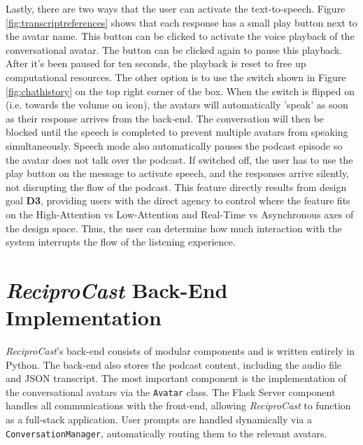 \documentclass[12pt]{report}
\begin{document}
\begin{myfont}
        \indent Lastly, there are two ways that the user can activate the text-to-speech. Figure \ref{fig:transcriptreferences} shows that each response has a small play button next to the avatar name. This button can be clicked to activate the voice playback of the conversational avatar. The button can be clicked again to pause this playback. After it's been paused for ten seconds, the playback is reset to free up computational resources. The other option is to use the switch shown in Figure \ref{fig:chathistory} on the top right corner of the box. When the switch is flipped on (i.e. towards the volume on icon), the avatars will automatically 'speak' as soon as their response arrives from the back-end. The conversation will then be blocked until the speech is completed to prevent multiple avatars from speaking simultaneously. Speech mode also automatically pauses the podcast episode so the avatar does not talk over the podcast. If switched off, the user has to use the play button on the message to activate speech, and the responses arrive silently, not disrupting the flow of the podcast. This feature directly results from design goal \textbf{D3}, providing users with the direct agency to control where the feature fits on the High-Attention vs Low-Attention and Real-Time vs Asynchronous axes of the design space. Thus, the user can determine how much interaction with the system interrupts the flow of the listening experience.

        \section{\textit{ReciproCast} Back-End Implementation}
        \indent \textit{ReciproCast}'s back-end consists of modular components and is written entirely in Python. The back-end also stores the podcast content, including the audio file and JSON transcript. The most important component is the implementation of the conversational avatars via the \texttt{Avatar} class. The Flask Server component handles all communications with the front-end, allowing \textit{ReciproCast} to function as a full-stack application. User prompts are handled dynamically via a \texttt{ConversationManager}, automatically routing them to the relevant avatars.
        

\end{myfont}
\end{document}
